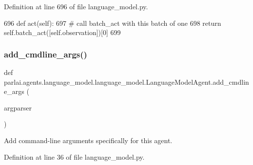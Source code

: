 Definition at line 696 of file language\+\_\+model.\+py.


\begin{DoxyCode}
696     \textcolor{keyword}{def }act(self):
697         \textcolor{comment}{# call batch\_act with this batch of one}
698         \textcolor{keywordflow}{return} self.batch\_act([self.observation])[0]
699 
\end{DoxyCode}
\mbox{\label{classparlai_1_1agents_1_1language__model_1_1language__model_1_1LanguageModelAgent_a935ed616ff38d97e918adb2345386631}} 
\subsubsection{\texorpdfstring{add\+\_\+cmdline\+\_\+args()}{add\_cmdline\_args()}}
{\footnotesize\ttfamily def parlai.\+agents.\+language\+\_\+model.\+language\+\_\+model.\+Language\+Model\+Agent.\+add\+\_\+cmdline\+\_\+args (\begin{DoxyParamCaption}\item[{}]{argparser }\end{DoxyParamCaption})\hspace{0.3cm}{\ttfamily [static]}}

\begin{DoxyVerb}Add command-line arguments specifically for this agent.
\end{DoxyVerb}
 

Definition at line 36 of file language\+\_\+model.\+py.


